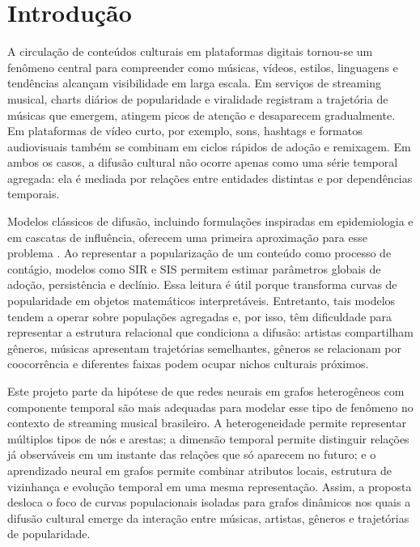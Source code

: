\chapter{Introdução}
\label{cap:introducao}

A circulação de conteúdos culturais em plataformas digitais tornou-se um fenômeno central para compreender como músicas, vídeos, estilos, linguagens e tendências alcançam visibilidade em larga escala. Em serviços de streaming musical, charts diários de popularidade e viralidade registram a trajetória de músicas que emergem, atingem picos de atenção e desaparecem gradualmente. Em plataformas de vídeo curto, por exemplo, sons, hashtags e formatos audiovisuais também se combinam em ciclos rápidos de adoção e remixagem. Em ambos os casos, a difusão cultural não ocorre apenas como uma série temporal agregada: ela é mediada por relações entre entidades distintas e por dependências temporais.

Modelos clássicos de difusão, incluindo formulações inspiradas em epidemiologia e em cascatas de influência, oferecem uma primeira aproximação para esse problema \citep{kempe2003ic,oliveira2025brasnam}. Ao representar a popularização de um conteúdo como processo de contágio, modelos como SIR e SIS permitem estimar parâmetros globais de adoção, persistência e declínio. Essa leitura é útil porque transforma curvas de popularidade em objetos matemáticos interpretáveis. Entretanto, tais modelos tendem a operar sobre populações agregadas e, por isso, têm dificuldade para representar a estrutura relacional que condiciona a difusão: artistas compartilham gêneros, músicas apresentam trajetórias semelhantes, gêneros se relacionam por coocorrência e diferentes faixas podem ocupar nichos culturais próximos.

Este projeto parte da hipótese de que redes neurais em grafos heterogêneos com componente temporal são mais adequadas para modelar esse tipo de fenômeno no contexto de streaming musical brasileiro. A heterogeneidade permite representar múltiplos tipos de nós e arestas; a dimensão temporal permite distinguir relações já observáveis em um instante das relações que só aparecem no futuro; e o aprendizado neural em grafos permite combinar atributos locais, estrutura de vizinhança e evolução temporal em uma mesma representação. Assim, a proposta desloca o foco de curvas populacionais isoladas para grafos dinâmicos nos quais a difusão cultural emerge da interação entre músicas, artistas, gêneros e trajetórias de popularidade.


